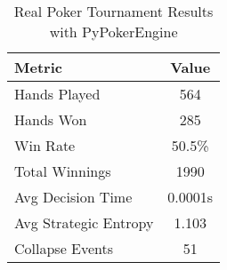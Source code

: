 \begin{table}[h]
\centering
\caption{Real Poker Tournament Results with PyPokerEngine}
\begin{tabular}{|l|c|}
\hline
Metric & Value \\
\hline
Hands Played & 564 \\
Hands Won & 285 \\
Win Rate & 50.5\% \\
Total Winnings & 1990 \\
Avg Decision Time & 0.0001s \\
Avg Strategic Entropy & 1.103 \\
Collapse Events & 51 \\
\hline
\end{tabular}
\end{table}